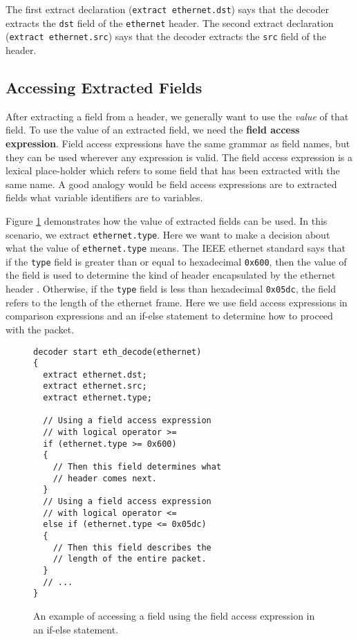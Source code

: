 The first extract declaration (\texttt{extract ethernet.dst}) says that the decoder extracts the \texttt{dst} field of the \texttt{ethernet} header. The second extract declaration (\texttt{extract ethernet.src}) says that the decoder extracts the \texttt{src} field of the  header. 

\subsection{Accessing Extracted Fields} \label{decoder_access_tut}

After extracting a field from a header, we generally want to use the \textit{value} of that field. To use the value of an extracted field, we need the \textbf{field access expression}. Field access expressions have the same grammar as field names, but they can be used wherever any expression is valid.  The field access expression is a lexical place-holder which refers to some field that has been extracted with the same name. A good analogy would be field access expressions are to extracted fields what variable identifiers are to variables.

Figure \ref{fg:access_ex} demonstrates how the value of extracted fields can be used. In this scenario, we extract \texttt{ethernet.type}. Here we want to make a decision about what the value of \texttt{ethernet.type} means. The IEEE ethernet standard says that if the \texttt{type} field is greater than or equal to hexadecimal \texttt{0x600}, then the value of the field is used to determine the kind of header encapsulated by the ethernet header \cite{eth_std}. Otherwise, if the \texttt{type} field is less than hexadecimal \texttt{0x05dc}, the field refers to the length of the ethernet frame. Here we use field access expressions in comparison expressions and an if-else statement to determine how to proceed with the packet. 

\begin{figure}[ht]
\begin{lstlisting}
decoder start eth_decode(ethernet)
{
  extract ethernet.dst;
  extract ethernet.src;
  extract ethernet.type;
  
  // Using a field access expression 
  // with logical operator >=
  if (ethernet.type >= 0x600)
  {
    // Then this field determines what
    // header comes next.
  }
  // Using a field access expression 
  // with logical operator <=
  else if (ethernet.type <= 0x05dc)
  {
    // Then this field describes the
    // length of the entire packet.
  }
  // ...
}
\end{lstlisting}
\caption{An example of accessing a field using the field access expression in an if-else statement.}
\label{fg:access_ex}
\end{figure}

